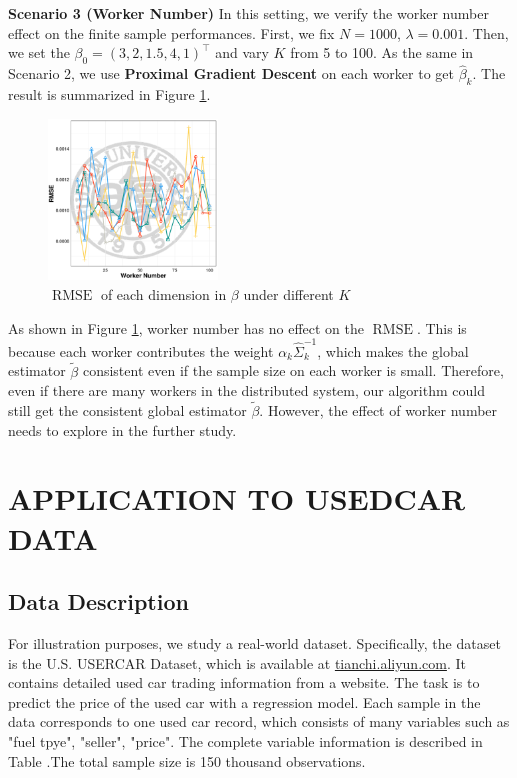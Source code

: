 \documentclass[11pt,en,authoryear]{elegantpaper}
\numberwithin{equation}{section}
\begin{document}
\noindent
{\sc \textbf{Scenario 3 (Worker Number)}}
In this setting, we verify the worker number effect on the finite sample performances. First, we fix $N = 1000$, $\lambda = 0.001$. Then, we set the $\beta_0 = (3, 2, 1.5, 4, 1)^{\top}$ and vary $K$ from 5 to 100. As the same in Scenario 2, we use \textbf{Proximal Gradient Descent} on each worker to get $\hat{\beta}_k$. The result is summarized in  Figure \ref{fig:effet_of_K}.
\vspace{-0.5cm}
\begin{center}
    \begin{figure}[h]
        \centering
        \includegraphics[width=0.4\textwidth]{image/scenario3}
        \caption{$\operatorname{RMSE}$ of each dimension in $\beta$ under different $K$}
        \label{fig:effet_of_K}
    \end{figure}
\end{center}
As shown in Figure \ref{fig:effet_of_K}, worker number has no effect on the $\operatorname{RMSE}$. This is because each worker contributes the weight $\alpha_k \hat{\Sigma}_k^{-1}$, which makes the global estimator $\tilde{\beta}$ consistent even if the sample size on each worker is small. Therefore, even if there are many workers in the distributed system, our algorithm could still get the  consistent global estimator $\tilde{\beta}$. However, the effect of worker number needs to explore in the further study.

\section{APPLICATION TO USEDCAR DATA}\label{sec:5}

\subsection{Data Description}

For illustration purposes, we study a real-world dataset. Specifically, the dataset is the U.S. USERCAR Dataset, which is available at \href{tianchi.aliyun.com}{tianchi.aliyun.com}. It contains detailed used car trading information from a website. The task is to predict the price of the used car with a regression model. Each sample in the data corresponds to one used car record, which consists of many variables such as "fuel tpye", "seller", "price". The complete variable information is described in Table .The total sample size is 150 thousand observations.
\end{document}
